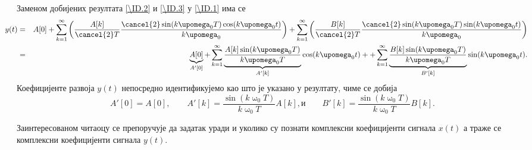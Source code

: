 Заменом добијених резултата \eqref{\ID.2} и \eqref{\ID.3} у \eqref{\ID.1} има се 
\begin{eqnarray}
    \hspace*{-4em}
    y(t) &=& A[0] + 
    \sum_{k = 1}^{\infty} \left( \dfrac{A[k]}{\cancel{2}T} \dfrac{\cancel{2}\sin(k\upomega_0 T)\cos(k\upomega_0 t)}{k\upomega_0} \right) + 
    \sum_{k = 1}^{\infty} \left( \dfrac{B[k]}{\cancel{2}T} \dfrac{\cancel{2}\sin(k\upomega_0 T)\sin(k\upomega_0 t)}{k\upomega_0} \right) 
    \\
    &=& \underbrace{A[0]}_{A'[0]}
    + \sum_{k = 1}^{\infty}
    \underbrace{\dfrac{A[k] \sin(k\upomega_0 T)}{k \upomega_0 T}}_{A'[k]} \cos(k\upomega_0 t) 
    +  
    + \sum_{k = 1}^{\infty}
    \underbrace{\dfrac{B[k] \sin(k\upomega_0 T)}{k \upomega_0 T}}_{B'[k]} \sin(k\upomega_0 t).
\end{eqnarray}
Коефицијенте развоја $y(t)$ непосредно идентификујемо као што је указано у резултату, чиме се добија 
\begin{equation}
    A'[0] = A[0], \qquad
    A'[k] = \dfrac{\sin(k\upomega_0 T)}{k\upomega_0 T} A[k], \text{и} \qquad
    B'[k] = \dfrac{\sin(k\upomega_0 T)}{k\upomega_0 T} B[k].
\end{equation}

Заинтересованом читаоцу се препоручује да задатак уради и уколико су познати комплексни коефицијенти сигнала $x(t)$ а
траже се комплексни коефицијенти сигнала $y(t)$. 